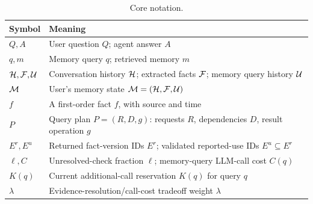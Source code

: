 \begin{table}[t]
\centering\small
\caption{Core notation.}
\label{tab:new-notation}
\begin{tabular}{@{}l p{}@{}}
\toprule
Symbol & Meaning\\
\midrule
$Q,A$ & User question $Q$; agent answer $A$\\
$q,m$ & Memory query $q$; retrieved memory $m$\\
$\mathcal{H},\mathcal{F},\mathcal{U}$ & Conversation history $\mathcal{H}$; extracted facts $\mathcal{F}$; memory query history $\mathcal{U}$\\
$\mathcal{M}$ & User's memory state $\mathcal{M}=(\mathcal{H},\mathcal{F},\mathcal{U})$\\
$f$ & A first-order fact $f$, with source and time\\
$P$ & Query plan $P=(R,D,g)$: requests $R$, dependencies $D$, result operation $g$\\
$E^r,E^u$ & Returned fact-version IDs $E^r$; validated reported-use IDs $E^u\subseteq E^r$\\
$\ell,C$ & Unresolved-check fraction $\ell$; memory-query LLM-call cost $C(q)$\\
$K(q)$ & Current additional-call reservation $K(q)$ for query $q$\\
$\lambda$ & Evidence-resolution/call-cost tradeoff weight $\lambda$\\
\bottomrule
\end{tabular}
\end{table}
